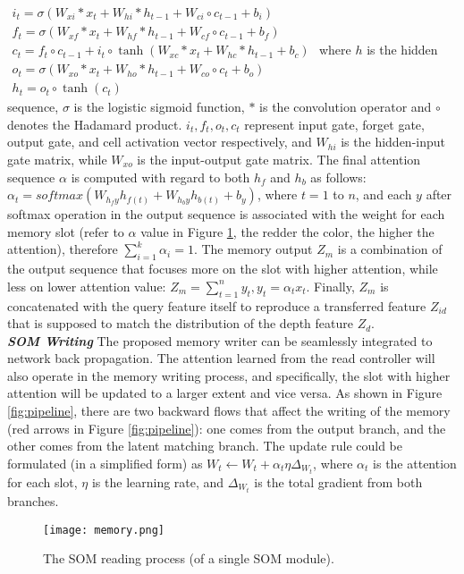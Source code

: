 \documentclass[letterpaper]{article} \usepackage{aaai20}  \usepackage{times}  \usepackage{helvet} \usepackage{courier}  \usepackage{graphicx} \frenchspacing  \setlength{\pdfpagewidth}{8.5in}  \setlength{\pdfpageheight}{11in}  \usepackage{epsfig}
\begin{document}
    $\begin{array}{ll}
    i_t = \sigma(W_{xi}\ast x_t + W_{hi}\ast h_{t-1} + W_{ci}\circ c_{t-1} + b_i)\\
    f_t = \sigma(W_{xf}\ast x_t + W_{hf}\ast h_{t-1} + W_{cf}\circ c_{t-1} + b_f)\\
    c_t = f_t \circ c_{t-1} + i_t \circ \tanh(W_{xc} \ast x_t + W_{hc} * h_{t-1} + b_c)\\
    o_t = \sigma(W_{xo} * x_t + W_{ho}\ast h_{t-1} + W_{co} \circ c_t + b_o)\\
    h_t = o_t \circ \tanh(c_t)
    \end{array}$
    where $h$ is the hidden sequence, $\sigma$ is the logistic sigmoid function, $\ast$ is the convolution operator and $\circ$ denotes the Hadamard product. $i_t, f_t, o_t, c_t$ represent input gate, forget gate, output gate, and cell activation vector respectively,  and $W_{hi}$ is the hidden-input gate matrix, while $W_{xo}$ is the input-output gate matrix.
    The final attention sequence $\alpha$ is computed with regard to both $h_f$ and $h_b$ as follows:
    $\alpha_t = softmax(W_{{h_f y}}{h_{f(t)}} + W_{{h_b}y}{h_{b(t)}} + b_y ) $,
    where $t=1$ to $n$, and each $y$ after softmax operation in the output sequence is associated with the weight for each memory slot  (refer to $\alpha$ value in Figure \ref{fig:memory}, the redder the color, the higher the attention), therefore $\sum_{i=1}^k\alpha_i=1$. The memory output $Z_m$ is a combination of the output sequence that focuses more on the slot with higher attention, while less on lower attention value:  $Z_m = \sum_{t=1}^n y_t, y_t = \alpha_t x_t $.
    Finally, $Z_m$ is concatenated with the query feature itself to reproduce a transferred feature $Z_{id}$ that is supposed to match the distribution of the depth feature $Z_d$. \\
    \indent\textbf{\textit{SOM Writing}} The proposed memory writer can be seamlessly integrated to network back propagation. The attention learned from the read controller will also operate in the memory writing process, and specifically, the slot with higher attention will be updated to a larger extent and vice versa. As shown in Figure \ref{fig:pipeline}, there are two backward flows that affect the writing of the memory (red arrows in Figure \ref{fig:pipeline}): one comes from the output branch, and the other comes from the latent matching branch. The update rule could be formulated (in a simplified form) as 
    $W_t \leftarrow W_t + \alpha_t \eta\Delta_{W_t}$, where $\alpha_t$ is the attention for each slot, $\eta$ is the learning rate, and $\Delta_{W_t}$ is the total gradient from both branches.
    \begin{figure}[t]
    	\centering
    	\texttt{[image: memory.png]}
    	\vspace{-10pt}
    	\caption{The SOM reading process (of a single SOM module).}
    	\label{fig:memory}
    	\vspace{-15pt}
    \end{figure}
    
\end{document}
